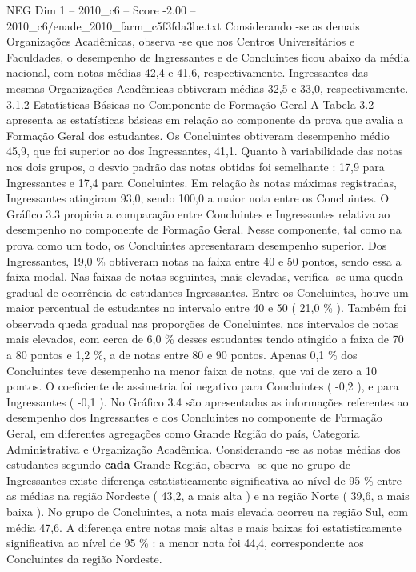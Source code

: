 \begin{textsample}{NEG Dim 1 – 2010\_c6 – Score -2.00 – 2010\_c6/enade\_2010\_farm\_c5f3fda3be.txt}
Considerando -se as demais Organizações Acadêmicas, observa -se que nos Centros Universitários e Faculdades, o desempenho de Ingressantes e de Concluintes ficou abaixo da média nacional, com notas médias 42,4 e 41,6, respectivamente.
Ingressantes das mesmas Organizações Acadêmicas obtiveram médias 32,5 e 33,0, respectivamente. 3.1.2 Estatísticas Básicas no Componente de Formação Geral A Tabela 3.2 apresenta as estatísticas básicas em relação ao componente da prova que avalia a Formação Geral dos estudantes.
Os Concluintes obtiveram desempenho médio 45,9, que foi superior ao dos Ingressantes, 41,1.
Quanto à variabilidade das notas nos dois grupos, o desvio padrão das notas obtidas foi semelhante : 17,9 para Ingressantes e 17,4 para Concluintes.
Em relação às notas máximas registradas, Ingressantes atingiram 93,0, sendo 100,0 a maior nota entre os Concluintes.
O Gráfico 3.3 propicia a comparação entre Concluintes e Ingressantes relativa ao desempenho no componente de Formação Geral.
Nesse componente, tal como na prova como um todo, os Concluintes apresentaram desempenho superior.
Dos Ingressantes, 19,0 \% obtiveram notas na faixa entre 40 e 50 pontos, sendo essa a faixa modal.
Nas faixas de notas seguintes, mais elevadas, verifica -se uma queda gradual de ocorrência de estudantes Ingressantes.
Entre os Concluintes, houve um maior percentual de estudantes no intervalo entre 40 e 50 ( 21,0 \% ).
Também foi observada queda gradual nas proporções de Concluintes, nos intervalos de notas mais elevados, com cerca de 6,0 \% desses estudantes tendo atingido a faixa de 70 a 80 pontos e 1,2 \%, a de notas entre 80 e 90 pontos.
Apenas 0,1 \% dos Concluintes teve desempenho na menor faixa de notas, que vai de zero a 10 pontos.
O coeficiente de assimetria foi negativo para Concluintes ( -0,2 ), e para Ingressantes ( -0,1 ).
No Gráfico 3.4 são apresentadas as informações referentes ao desempenho dos Ingressantes e dos Concluintes no componente de Formação Geral, em diferentes agregações como Grande Região do país, Categoria Administrativa e Organização Acadêmica.
Considerando -se as notas médias dos estudantes segundo \textbf{cada} Grande Região, observa -se que no grupo de Ingressantes existe diferença estatisticamente significativa ao nível de 95 \% entre as médias na região Nordeste ( 43,2, a mais alta ) e na região Norte ( 39,6, a mais baixa ).
No grupo de Concluintes, a nota mais elevada ocorreu na região Sul, com média 47,6.
A diferença entre notas mais altas e mais baixas foi estatisticamente significativa ao nível de 95 \% : a menor nota foi 44,4, correspondente aos Concluintes da região Nordeste.

\end{textsample}
